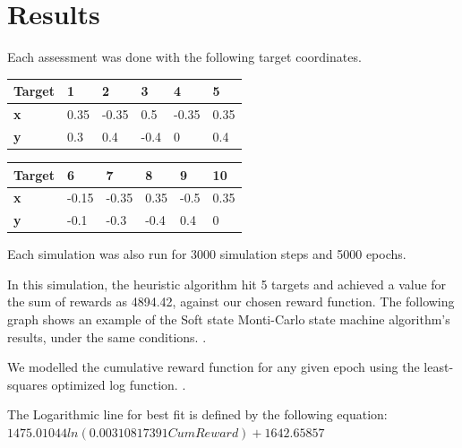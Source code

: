\section{Results}


Each assessment was done with the following target coordinates.

\begingroup
{\centering
    \begin{tabular}{|l|l|l|l|l|l|}
    \hline
    \textbf{Target} & \textbf{1} & \textbf{2} & \textbf{3} & \textbf{4} & \textbf{5}  \\ \hline
    \textbf{x}      & 0.35       & -0.35      & 0.5        & -0.35      & 0.35        \\ \hline
    \textbf{y}      & 0.3        & 0.4        & -0.4       & 0          & 0.4         \\ \hline
    \end{tabular}
    \begin{tabular}{|l|l|l|l|l|l|}
        \hline
        \textbf{Target} & \textbf{6} & \textbf{7} & \textbf{8} & \textbf{9} & \textbf{10} \\ \hline
        \textbf{x}      & -0.15      & -0.35      & 0.35       & -0.5       & 0.35        \\ \hline
        \textbf{y}      & -0.1       & -0.3       & -0.4       & 0.4        & 0           \\ \hline
        \end{tabular}
}
\endgroup


Each simulation was also run for 3000 simulation steps and 5000 epochs.

In this simulation, the heuristic algorithm hit 5 targets and achieved a value for the sum of rewards as 4894.42, against our chosen reward function.
The following graph shows an example of the Soft state Monti-Carlo state machine algorithm’s results, under the same conditions. .

We modelled the cumulative reward function for any given epoch using the least-squares optimized log function. .

The Logarithmic line for best fit is defined by the following equation:
\begingroup\centering
$1475.01044ln(0.00310817391CumReward) + 1642.65857$
\endgroup

